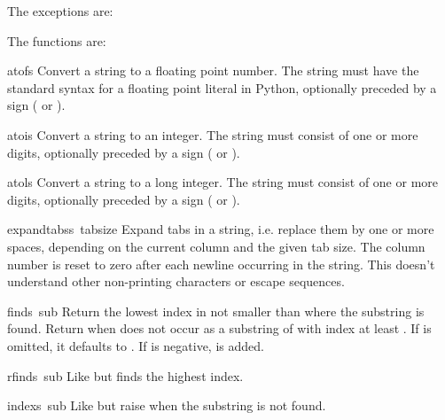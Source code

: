 The exceptions are:

\renewcommand{\indexsubitem}{(exception in module string)}

The functions are:

\renewcommand{\indexsubitem}{(in module string)}

\begin{funcdesc}{atof}{s}
Convert a string to a floating point number.  The string must have
the standard syntax for a floating point literal in Python, optionally
preceded by a sign (\samp{+} or \samp{-}).
\end{funcdesc}

\begin{funcdesc}{atoi}{s}
Convert a string to an integer.  The string must consist of one or more
digits, optionally preceded by a sign (\samp{+} or \samp{-}).
\end{funcdesc}

\begin{funcdesc}{atol}{s}
Convert a string to a long integer.  The string must consist of one
or more digits, optionally preceded by a sign (\samp{+} or \samp{-}).
\end{funcdesc}

\begin{funcdesc}{expandtabs}{s\, tabsize}
Expand tabs in a string, i.e. replace them by one or more spaces,
depending on the current column and the given tab size.  The column
number is reset to zero after each newline occurring in the string.
This doesn't understand other non-printing characters or escape
sequences.
\end{funcdesc}

\begin{funcdesc}{find}{s\, sub}
Return the lowest index in  not smaller than  where the
substring  is found.  Return  when 
does not occur as a substring of  with index at least .
If  is omitted, it defaults to .  If  is
negative,  is added.
\end{funcdesc}

\begin{funcdesc}{rfind}{s\, sub}
Like  but finds the highest index.
\end{funcdesc}

\begin{funcdesc}{index}{s\, sub}
Like  but raise  when the substring is
not found.
\end{funcdesc}

